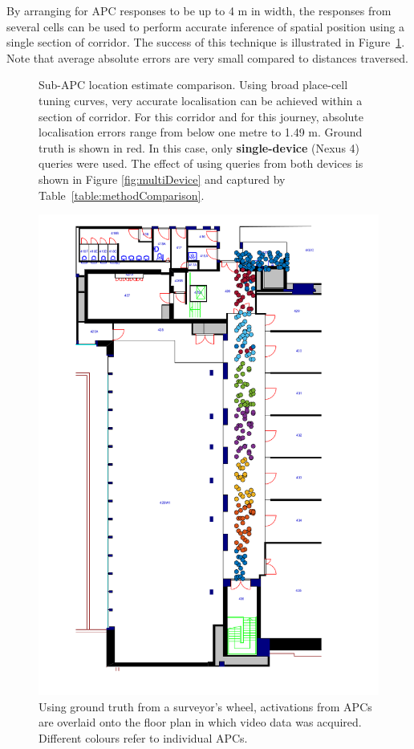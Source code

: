 By arranging for APC responses to be up to 4 m in width, the responses from several cells can be used to perform accurate inference of spatial position using a single section of corridor.  The success of this technique is illustrated in Figure~\ref{fig:sublocMethodComp}. Note that average absolute errors are very small compared to distances traversed.


\begin{figure}
\centering
	\setlength{}
	\setlength{}
		
\caption{Sub-APC location estimate comparison. Using broad place-cell tuning curves, very accurate localisation can
be achieved within a section of corridor. For this corridor and for this journey,
absolute localisation errors range from below one metre to 1.49 m. Ground truth is shown in red. In this case, only \textbf{single-device} (Nexus 4) queries were used. The effect of using queries from both devices is shown in Figure \ref{fig:multiDevice} and captured by Table~\ref{table:methodComparison}.}
\label{fig:sublocMethodComp}
\end{figure}

\begin{figure}
\centering
\includegraphics[height=\linewidth]{gfx/Chapter05/placeCellsExperiment_withDetection_5px.png}
\caption{Using ground truth from a surveyor's wheel, activations from APCs are overlaid onto the floor plan in which video data was acquired. Different colours refer to individual APCs.}
\label{fig:floorplan}
\end{figure}

